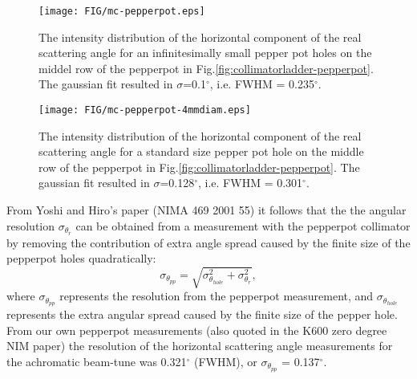 \documentclass[11pt]{report}
\begin{document}
\begin{figure}
\centering
\texttt{[image: FIG/mc-pepperpot.eps]}
\centering
\caption{The intensity distribution of the horizontal component of the real scattering angle for 
an infinitesimally small pepper pot holes on the middel row of the pepperpot in Fig.\ref{fig:collimatorladder-pepperpot}.
The gaussian fit resulted in $\sigma$=0.1$^{\circ}$, i.e. FWHM = 0.235$^{\circ}$.}
\label{fig:mc-pepperpot}
\end{figure} 
\begin{figure}
\centering
\texttt{[image: FIG/mc-pepperpot-4mmdiam.eps]}
\centering
\caption{The intensity distribution of the horizontal component of the real scattering angle for 
a standard size pepper pot hole on the middle row of the pepperpot in Fig.\ref{fig:collimatorladder-pepperpot}.
The gaussian fit resulted in $\sigma$=0.128$^{\circ}$, i.e. FWHM = 0.301$^{\circ}$.}
\label{fig:mc-pepperpot-4mmdiam}
\end{figure} 





From Yoshi and Hiro's  paper (NIMA 469 2001 55) it follows that the 
the angular resolution $\sigma_{\theta_{r}}$ can be obtained from  a measurement with the pepperpot collimator by removing the contribution of extra angle spread caused by the finite
size of the pepperpot holes quadratically:
\begin{equation} 
	\sigma_{\theta_{pp}}=  \sqrt{ \sigma_{\theta_{hole}}^2  +\sigma_{\theta_{r}}^2 },
\end{equation} 
where $\sigma_{\theta_{pp}}$ represents the resolution from the pepperpot measurement, and $\sigma_{\theta_{hole}}$ represents the extra angular spread caused by the finite size of the pepper hole.  From our own pepperpot measurements (also quoted in the K600 zero degree NIM paper)
the resolution of the horizontal scattering angle measurements 
for the achromatic beam-tune was 0.321$^{\circ}$ (FWHM), or 
$\sigma_{\theta_{pp}}$ = 0.137$^{\circ}$. 
%
%
\end{document}
